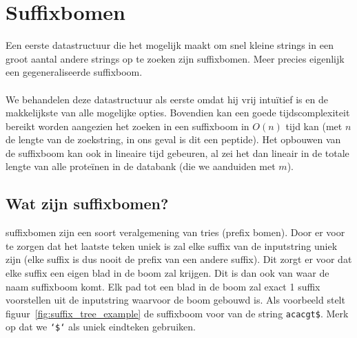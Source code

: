 \chapter{Suffixbomen}\label{ch:suffix-bomen}
Een eerste datastructuur die het mogelijk maakt om snel kleine strings in een groot aantal andere strings op te zoeken zijn suffixbomen.
Meer precies eigenlijk een gegeneraliseerde suffixboom.
\\ \\
We behandelen deze datastructuur als eerste omdat hij vrij intuïtief is en de makkelijkste van alle mogelijke opties.
Bovendien kan een goede tijdscomplexiteit bereikt worden aangezien het zoeken in een suffixboom in $O(n)$ tijd kan (met $n$ de lengte van de zoekstring, in ons geval is dit een peptide).
Het opbouwen van de suffixboom kan ook in lineaire tijd gebeuren, al zei het dan lineair in de totale lengte van alle proteïnen in de databank (die we aanduiden met $m$). %

\section{Wat zijn suffixbomen?}\label{sec:wat-zijn-suffix-bomen?}
suffixbomen zijn een soort veralgemening van tries (prefix bomen).
Door er voor te zorgen dat het laatste teken uniek is zal elke suffix van de inputstring uniek zijn (elke suffix is dus nooit de prefix van een andere suffix).
Dit zorgt er voor dat elke suffix een eigen blad in de boom zal krijgen.
Dit is dan ook van waar de naam suffixboom komt.
Elk pad tot een blad in de boom zal exact 1 suffix voorstellen uit de inputstring waarvoor de boom gebouwd is.
Als voorbeeld stelt figuur~\ref{fig:suffix_tree_example} de suffixboom voor van de string \texttt{acacgt\$}.
Merk op dat we \texttt{`\$`} als uniek eindteken gebruiken.


